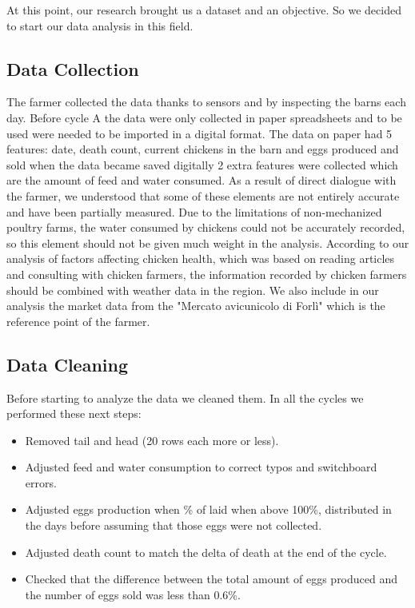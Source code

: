 \documentclass[11pt]{article}
\begin{document}
At this point, our research brought us a dataset and an objective. So we decided to start our data analysis in this field.

\subsection{Data Collection}
The farmer collected the data thanks to sensors and by inspecting the barns each day. Before cycle A the data were only collected in paper spreadsheets and to be used were needed to be imported in a digital format.
The data on paper had 5 features: date, death count, current chickens in the barn and eggs produced and sold
when the data became saved digitally 2 extra features were collected which are the amount of feed and water consumed. 
As a result of direct dialogue with the farmer, we understood that some of these elements are not entirely accurate and have been partially measured. Due to the limitations of non-mechanized poultry farms, the water consumed by chickens could not be accurately recorded, so this element should not be given much weight in the analysis.
According to our analysis of factors affecting chicken health, which was based on reading articles and consulting with chicken farmers, the information recorded by chicken farmers should be combined with weather data in the region.
We also include in our analysis the market data from the "Mercato avicunicolo di Forlì" which is the reference point of the farmer.

\subsection{Data Cleaning}
Before starting to analyze the data we cleaned them.
In all the cycles we performed these next steps:
\begin{itemize}
    \item Removed tail and head (20 rows each more or less).
    \item Adjusted feed and water consumption to correct typos and switchboard errors.
    \item Adjusted eggs production when \% of laid when above 100\%, distributed in the days before assuming that those eggs were not collected.
    \item Adjusted death count to match the delta of death at the end of the cycle.
    \item Checked that the difference between the total amount of eggs produced and the number of eggs sold was less than 0.6\%.
\end{itemize}
\end{document}
